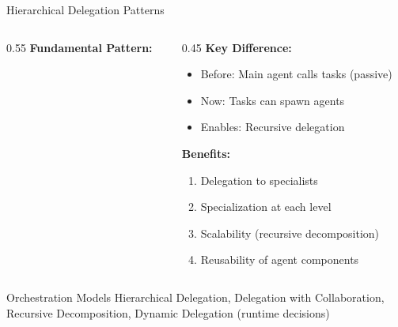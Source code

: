 \documentclass[aspectratio=169,11pt]{beamer}
\begin{document}
\begin{frame}{Hierarchical Delegation Patterns}
    \begin{columns}[T]
        \begin{column}{0.55\textwidth}
            \textbf{Fundamental Pattern:}
            \begin{center}
            \end{center}
        \end{column}
        \begin{column}{0.45\textwidth}
            \textbf{Key Difference:}
            \begin{itemize}
                \item Before: Main agent calls tasks (passive)
                \item Now: Tasks can spawn agents
                \item Enables: Recursive delegation
            \end{itemize}

            \vspace{0.3cm}
            \textbf{Benefits:}
            \begin{enumerate}
                \item Delegation to specialists
                \item Specialization at each level
                \item Scalability (recursive decomposition)
                \item Reusability of agent components
            \end{enumerate}
        \end{column}
    \end{columns}

    \vspace{0.2cm}
    \begin{alertblock}{Orchestration Models}
        Hierarchical Delegation, Delegation with Collaboration, Recursive Decomposition, Dynamic Delegation (runtime decisions)
    \end{alertblock}
\end{frame}
\end{document}
